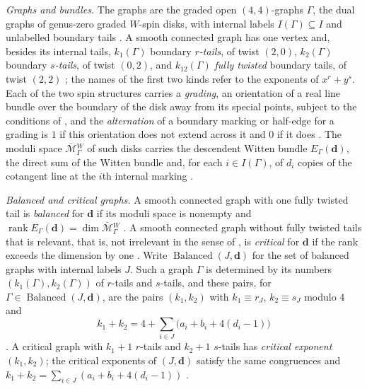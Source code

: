 \emph{Graphs and bundles.}  The graphs are the graded open $(4,4)$-graphs
$\Gamma$, the dual graphs of genus-zero graded $W$-spin disks, with internal
labels $I(\Gamma)\subseteq I$ and unlabelled boundary tails
\cite[Defs.~1.41 and~3.21]{grossetal2022open}.  A smooth connected graph has
one vertex and, besides its internal tails, $k_1(\Gamma)$ boundary
\emph{$r$-tails}, of twist $(2,0)$, $k_2(\Gamma)$ boundary \emph{$s$-tails},
of twist $(0,2)$, and $k_{12}(\Gamma)$ \emph{fully twisted} boundary tails,
of twist $(2,2)$ \cite[\S2.4 and Notation~2.27]{grossetal2022open}; the names
of the first two kinds refer to the exponents of $x^r+y^s$.  Each of the
two spin structures carries a \emph{grading}, an orientation of a real line
bundle over the boundary of the disk away from its special points, subject
to the conditions of \cite[Def.~1.29]{grossetal2022open}, and the
\emph{alternation} of a boundary marking or half-edge for a grading is $1$
if this orientation does not extend across it and $0$ if it does
\cite[Defs.~1.21, 1.23 and~1.29]{grossetal2022open}.  The moduli
space $\overline{\mathcal M}{}^W_\Gamma$ of such disks carries the descendent
Witten bundle $E_\Gamma(\mathbf d)$, the direct sum of the Witten bundle and,
for each $i\in I(\Gamma)$, of $d_i$ copies of the cotangent line at the
$i$th internal marking \cite[Def.~2.16]{grossetal2022open}.

\emph{Balanced and critical graphs.}  A smooth connected graph with one fully
twisted tail is \emph{balanced} for $\mathbf d$ if its moduli space is nonempty
and
$\operatorname{rank}E_\Gamma(\mathbf d)=\dim\overline{\mathcal M}{}^W_\Gamma$
\cite[Def.~2.32]{grossetal2022open}.  A smooth connected graph without fully
twisted tails that is relevant, that is, not irrelevant in the sense of
\cite[Def.~1.57]{grossetal2022open}, is \emph{critical} for $\mathbf d$ if
the rank exceeds the dimension by one \cite[Def.~2.33(1)]{grossetal2022open}.
Write $\operatorname{Balanced}(J,\mathbf d)$ for the set of balanced graphs
with internal labels $J$.  Such a graph $\Gamma$ is determined by its numbers
$(k_1(\Gamma),k_2(\Gamma))$ of $r$-tails and $s$-tails, and these pairs, for
$\Gamma\in\operatorname{Balanced}(J,\mathbf d)$, are the pairs $(k_1,k_2)$ with
$k_1\equiv r_J$, $k_2\equiv s_J$ modulo $4$ and
\[
 k_1+k_2=4+\sum_{i\in J}\bigl(a_i+b_i+4(d_i-1)\bigr)
\]
\cite[Prop.~2.31 and Notation~2.40]{grossetal2022open}.  A critical graph with
$k_1+1$ $r$-tails and $k_2+1$ $s$-tails has
\emph{critical exponent} $(k_1,k_2)$; the critical exponents of
$(J,\mathbf d)$ satisfy the same congruences and
$k_1+k_2=\sum_{i\in J}(a_i+b_i+4(d_i-1))$
\cite[Prop.~2.39 and Notation~2.40]{grossetal2022open}.

